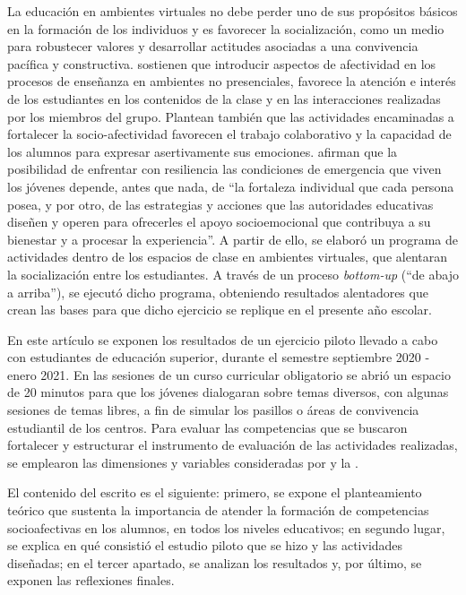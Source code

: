 \documentclass{textolivre}
\begin{document}
La educación en ambientes virtuales no debe perder uno de sus propósitos básicos en la formación de los individuos y es favorecer la socialización, como un medio para robustecer valores y desarrollar actitudes asociadas a una convivencia pacífica y constructiva. \textcite{briztena2020} sostienen que introducir aspectos de afectividad en los procesos de enseñanza en ambientes no presenciales, favorece la atención e interés de los estudiantes en los contenidos de la clase y en las interacciones realizadas por los miembros del grupo. Plantean también que las actividades encaminadas a fortalecer la socio-afectividad favorecen el trabajo colaborativo y la capacidad de los alumnos para expresar asertivamente sus emociones. \textcite[p. 50]{lopez2021} afirman que la posibilidad de enfrentar con resiliencia las condiciones de emergencia que viven los jóvenes depende, antes que nada, de “la fortaleza individual que cada persona posea, y por otro, de las estrategias y acciones que las autoridades educativas diseñen y operen para ofrecerles el apoyo socioemocional que contribuya a su bienestar y a procesar la experiencia”. A partir de ello, se elaboró un programa de actividades dentro de los espacios de clase en ambientes virtuales, que alentaran la socialización entre los estudiantes. A través de un proceso \emph{bottom-up} (“de abajo a arriba”), se ejecutó dicho programa, obteniendo resultados alentadores que crean las bases para que dicho ejercicio se replique en el presente año escolar. 

En este artículo se exponen los resultados de un ejercicio piloto llevado a cabo con estudiantes de educación superior, durante el semestre septiembre 2020 - enero 2021. En las sesiones de un curso curricular obligatorio se abrió un espacio de 20 minutos para que los jóvenes dialogaran sobre temas diversos, con algunas sesiones de temas libres, a fin de simular los pasillos o áreas de convivencia estudiantil de los centros. Para evaluar las competencias que se buscaron fortalecer y estructurar el instrumento de evaluación de las actividades realizadas, se emplearon las dimensiones y variables consideradas por \textcite{mikulic2015} y la \textcite{secretaria2018}.

El contenido del escrito es el siguiente: primero, se expone el planteamiento teórico que sustenta la importancia de atender la formación de competencias socioafectivas en los alumnos, en todos los niveles educativos; en segundo lugar, se explica en qué consistió el estudio piloto que se hizo y las actividades diseñadas; en el tercer apartado, se analizan los resultados y, por último, se exponen las reflexiones finales.
\end{document}
